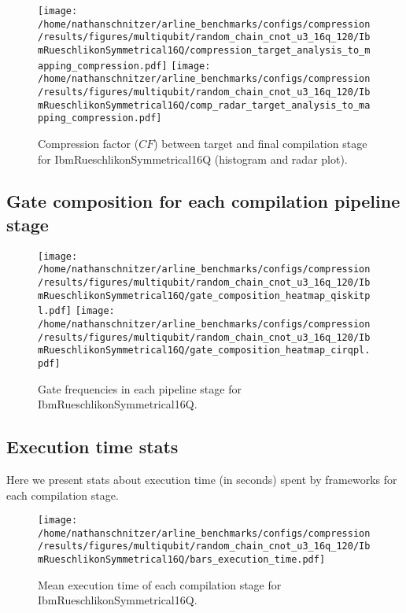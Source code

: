 \documentclass{report}%
\begin{document}
%


\begin{figure}[h!]%
\centering%
\texttt{[image: /home/nathanschnitzer/arline\_benchmarks/configs/compression/results/figures/multiqubit/random\_chain\_cnot\_u3\_16q\_120/IbmRueschlikonSymmetrical16Q/compression\_target\_analysis\_to\_mapping\_compression.pdf]}%
\centering%
\texttt{[image: /home/nathanschnitzer/arline\_benchmarks/configs/compression/results/figures/multiqubit/random\_chain\_cnot\_u3\_16q\_120/IbmRueschlikonSymmetrical16Q/comp\_radar\_target\_analysis\_to\_mapping\_compression.pdf]}%
\caption{Compression factor ($CF$) between target and final compilation stage for IbmRueschlikonSymmetrical16Q
                        (histogram and radar plot).
                        }%
\end{figure}

%
\clearpage%
\subsection*{Gate composition for each compilation pipeline stage}%
\label{subsec:Gatecompositionforeachcompilationpipelinestage}%

%


\begin{figure}[h!]%
\centering%
\texttt{[image: /home/nathanschnitzer/arline\_benchmarks/configs/compression/results/figures/multiqubit/random\_chain\_cnot\_u3\_16q\_120/IbmRueschlikonSymmetrical16Q/gate\_composition\_heatmap\_qiskitpl.pdf]}%
\centering%
\texttt{[image: /home/nathanschnitzer/arline\_benchmarks/configs/compression/results/figures/multiqubit/random\_chain\_cnot\_u3\_16q\_120/IbmRueschlikonSymmetrical16Q/gate\_composition\_heatmap\_cirqpl.pdf]}%
\linebreak%
\caption{Gate frequencies in each pipeline stage for IbmRueschlikonSymmetrical16Q.}%
\end{figure}

%
\subsection*{Execution time stats }%
\label{subsec:Executiontimestats}%

%
Here we present stats about execution time (in seconds)
                spent by frameworks for each compilation stage.%


\begin{figure}[h!]%
\centering%
\texttt{[image: /home/nathanschnitzer/arline\_benchmarks/configs/compression/results/figures/multiqubit/random\_chain\_cnot\_u3\_16q\_120/IbmRueschlikonSymmetrical16Q/bars\_execution\_time.pdf]}%
\caption{Mean execution time of each compilation stage for IbmRueschlikonSymmetrical16Q.}%
\end{figure}
\end{document}
